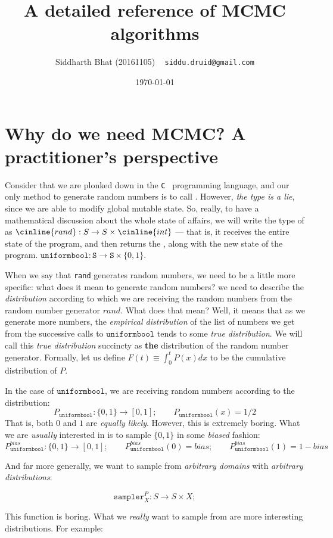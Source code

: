 \documentclass[titlepage]{article}
\title{A detailed reference of MCMC algorithms}
\author{Siddharth Bhat (20161105) ~ \texttt{siddu.druid@gmail.com}}
\date{\today}
\renewcommand{\S}{\texttt{S}}
\newcommand{\zo}{\{0, 1\}}
\newcommand{\uniformbool}{\texttt{uniformbool}}
\begin{document}
\maketitle
\section{Why do we need MCMC? A practitioner's perspective}
Consider that we are plonked down in the \texttt{C } programming language, and
our only method to generate random numbers is to call .
However, \emph{the type is a lie}, since we are able to modify global mutable
state. So, really, to have a mathematical discussion about the whole state
of affairs, we will write the type of  as
$\cinline{rand}: S \rightarrow S \times \cinline{int}$ --- that is,
it receives the entire state of the program, and then returns the ,
along with the new state of the program.
$\uniformbool: \S \rightarrow \S \times \zo$.

When we say that \texttt{rand} generates random numbers, we need to be a
little more specific: what does it mean to generate random numbers? we need to
describe the \emph{distribution} according to which we are receiving the random
numbers from the random number generator $rand$.  What does that mean?
Well, it means that as we generate more numbers, the \emph{empirical distribution}
of the list of numbers we get from the successive calls to $\uniformbool$ tends
to some \emph{true distribution}. We will call this \emph{true distribution}
succincty as \textbf{the} distribution of the random number generator. Formally,
let us define $F(t) \equiv \int_0^t P(x) dx$ to be the cumulative distribution 
of $P$.

In the case of 
$\uniformbool$, we are receiving random numbers according to the distribution:
$$
P_{\uniformbool}: \zo \rightarrow [0, 1]; \qquad P_{\uniformbool}(x) = 1/2
$$
That is, both $0$ and $1$ are \emph{equally likely}. However, this is
extremely boring. What we are \emph{usually} interested in is to sample $\{0, 1\}$
in some \emph{biased} fashion:
$$
P_{\uniformbool}^{bias}: \zo \rightarrow [0, 1]; 
\qquad P_{\uniformbool}^{bias}(0) = bias;
\qquad P_{\uniformbool}^{bias}(1) = 1 - bias
$$

And far more generally, we want to sample from \emph{arbitrary domains} with
\emph{arbitrary distributions}:

$$
\texttt{sampler}_X^P: S \rightarrow S \times X; 
$$

This function is boring. What we \emph{really} want to sample from are
more interesting distributions. For example:
\end{document}
